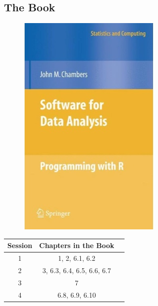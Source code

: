 \subsection*{The Book}
    \begin{figure}[ht]
      \centering
      \includegraphics[width = 8 cm]{./viz/ext/book_intro_toR.jpeg}
    \end{figure}

    \begin{center}
      \begin{tabular}{ |c|c|c| } 
        \hline
          \textbf{\large Session} & \textbf{\large Chapters in the Book}  \\
        \hline   
          1 &  1, 2, 6.1, 6.2 \\
        \hline
          2 & 3, 6.3, 6.4, 6.5, 6.6, 6.7\\
        \hline  
          3 &  7 \\
        \hline
          4 & 6.8, 6.9, 6.10 \\
        \hline       
      \end{tabular}
    \end{center}

